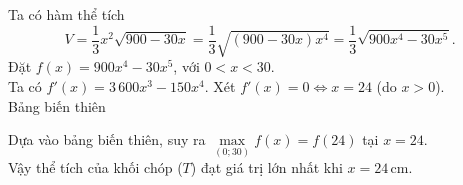 \begin{ex}
{\begin{itemchoice}
			\itemch Ta có hàm thể tích
			\[ V = \dfrac{1}{3}x^2\sqrt{900-30x} = \dfrac{1}{3}\sqrt{(900-30x)x^4} = \dfrac{1}{3}\sqrt{900x^4-30x^5}. \]
			Đặt $f(x)=900x^4-30x^5$, với $0<x<30$.\\
			Ta có $f'(x)=3\,600x^3-150x^4$. Xét $f'(x)=0 \Leftrightarrow x=24$ (do $x>0$).\\
			Bảng biến thiên
			\begin{center}
			\end{center}
			Dựa vào bảng biến thiên, suy ra $\max\limits_{(0;30)} f(x)=f(24)$ tại $x=24$.\\
			Vậy thể tích của khối chóp ($T$) đạt giá trị lớn nhất khi $x=24$\,cm.
		\end{itemchoice}
	}
\end{ex}

